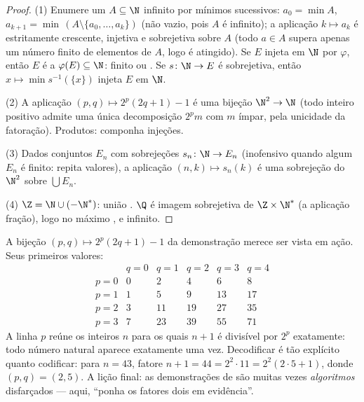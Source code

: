 \begin{proof}
(1) Enumere um $A \subseteq \N$ infinito por mínimos sucessivos: $a_0 =
\min A$, $a_{k+1} = \min\,(A \setminus \{a_0, \dots, a_k\})$
(não vazio, pois $A$ é infinito); a aplicação $k \mapsto a_k$ é estritamente
crescente, injetiva e sobrejetiva sobre $A$ (todo $a \in A$
supera apenas um número finito de elementos de $A$, logo é atingido). Se $E$
injeta em $\N$ por $\varphi$, então $E$ é  a
$\varphi(E) \subseteq \N$: finito ou . Se $s \colon \N \to
E$ é sobrejetiva, então $x \mapsto \min s^{-1}(\{x\})$ injeta $E$
em $\N$.

(2) A aplicação $(p, q) \mapsto 2^p(2q + 1) - 1$ é uma bijeção $\N^2
\to \N$ (todo inteiro positivo admite uma única decomposição
$2^p m$ com $m$ ímpar, pela unicidade da fatoração). Produtos: componha
injeções.

(3) Dados conjuntos $E_n$ com sobrejeções $s_n \colon \N \to E_n$
(inofensivo quando algum $E_n$ é finito: repita valores), a aplicação $(n, k)
\mapsto s_n(k)$ é uma sobrejeção do  $\N^2$ sobre
$\bigcup E_n$.

(4) $\Z = \N \cup (-\N^*)$: união . $\Q$ é imagem sobrejetiva
de $\Z \times \N^*$ (a aplicação fração), logo no máximo
, e infinito.
\end{proof}

\begin{example}\label{ex:b2:structures:pairing}
A bijeção $(p, q) \mapsto 2^p(2q + 1) - 1$ da demonstração
merece ser vista em ação. Seus primeiros valores:
\[
\begin{array}{c|ccccc}
 & q = 0 & q = 1 & q = 2 & q = 3 & q = 4\\
\hline
p = 0 & 0 & 2 & 4 & 6 & 8\\
p = 1 & 1 & 5 & 9 & 13 & 17\\
p = 2 & 3 & 11 & 19 & 27 & 35\\
p = 3 & 7 & 23 & 39 & 55 & 71
\end{array}
\]
A linha $p$ reúne os inteiros $n$ para os quais $n + 1$ é divisível
por $2^p$ exatamente: todo número natural aparece exatamente uma vez.
Decodificar é tão explícito quanto codificar: para $n = 43$, fatore $n + 1
= 44 = 2^2\cdot 11 = 2^2(2\cdot5 + 1)$, donde $(p, q) = (2, 5)$.
A lição final: as demonstrações de  são muitas vezes
\emph{algoritmos} disfarçados --- aqui, ``ponha os fatores dois em evidência''.
\end{example}

